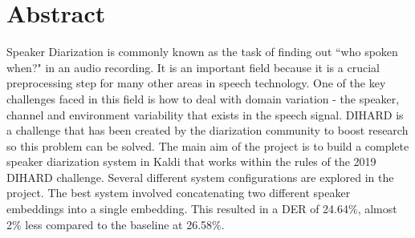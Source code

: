 \chapter*{\Large \center Abstract}

Speaker Diarization is commonly known as the task of finding out ``who spoken when?" in an audio recording. It is an important field because it is a crucial preprocessing step for many other areas in speech technology. One of the key challenges faced in this field is how to deal with domain variation - the speaker, channel and environment variability that exists in the speech signal. DIHARD is a challenge that has been created by the diarization community to boost research so this problem can be solved.
The main aim of the project is to build a complete speaker diarization system in Kaldi that works within the rules of the 2019 DIHARD challenge. Several different system configurations are explored in the project. The best system involved concatenating two different speaker embeddings into a single embedding. This resulted in a DER of 24.64\%, almost 2\% less compared to the baseline at 26.58\%.

